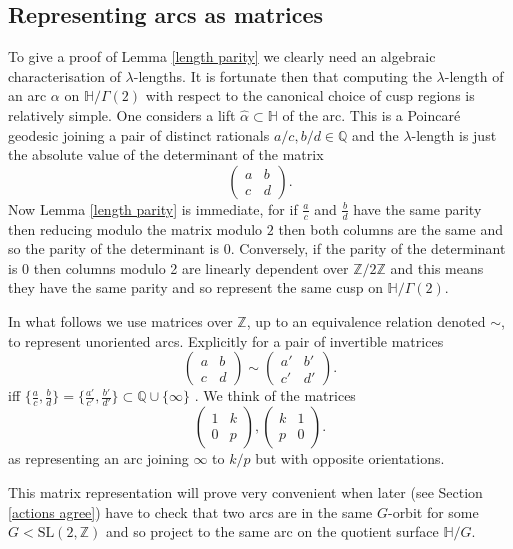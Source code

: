 \documentclass[12pt,a4paper]{amsart}
\def\HH{\mathbb{H}}
\def\g2{\Gamma(2)}
\def\xx{\HH/\g2}
\def\ZZ{\mathbb{Z}}
\def\sl2{\mathrm{SL}(2, \ZZ)}
\begin{document}
\subsection{Representing arcs as matrices}
To give a proof of Lemma \ref{length parity}
we clearly need an algebraic characterisation of $\lambda$-lengths.
It is fortunate then that computing the $\lambda$-length of an arc $\alpha$ on $\xx$
with respect to the canonical choice of cusp regions
is relatively simple.
One considers a lift $\hat{\alpha}\subset \mathbb{H}$ of the arc.
This is a Poincaré geodesic joining a pair of distinct rationals
$a/c,b/d \in \mathbb{Q}$ and the $\lambda$-length is just
the absolute value of the determinant of the matrix
$$ 
 \begin{pmatrix} a & b \\ c & d \end{pmatrix}.
$$
Now Lemma \ref{length parity}
is immediate, for if $\frac{a}{c}$ and $\frac{b}{d}$
have the same parity then reducing modulo the 
matrix modulo $2$ then both columns are the same
and so the parity of the determinant is $0$.
Conversely, if the parity of the determinant is $0$
then columns  modulo 2 are linearly dependent over
$\mathbb{Z}/2\mathbb{Z}$ and this means they have the same parity
and so represent the same cusp on $\xx$.

In what follows we use matrices over $\mathbb{Z}$,
up to an equivalence relation denoted $\sim$,
to represent unoriented arcs.
Explicitly  for a pair of invertible matrices 
$$ 
 \begin{pmatrix} a & b \\ c & d \end{pmatrix} \sim
 \begin{pmatrix} a' & b' \\ c' & d' \end{pmatrix}.
$$
iff $\{\frac{a}{c}, \frac{b}{d}\} = \{\frac{a'}{c'}, \frac{b'}{d'}\}
\subset \mathbb{Q}\cup \{\infty\}$
. 
We think of the matrices 
$$
 \begin{pmatrix} 1 & k \\ 0 & p \end{pmatrix},
 \begin{pmatrix} k & 1 \\ p  & 0 \end{pmatrix}.
$$
as representing an arc joining $\infty$ to $k/p$
but with opposite orientations.

This matrix representation will prove very convenient when later
(see Section \ref{actions agree})
have to check that two arcs are in the same $G$-orbit for some $G <
\sl2$ and so project to the same arc on the quotient surface
$\mathbb{H}/G$.
\end{document}
